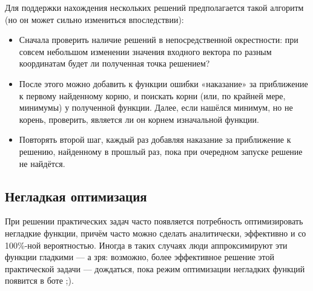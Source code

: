 \documentclass[11pt]{article}
\begin{document}
    Для поддержки нахождения нескольких решений предполагается такой алгоритм (но он может сильно измениться впоследствии):
    \begin{itemize}
        \item Сначала проверить наличие решений в непосредственной окрестности: при совсем небольшом изменении значения входного вектора
        по разным координатам будет ли полученная точка решением?
        \item После этого можно добавить к функции ошибки «наказание» за приближение к первому найденному корню, и поискать корни
        (или, по крайней мере, минимумы) у полученной функции. Далее, если нашёлся минимум, но не корень, проверить,
        является ли он корнем изначальной функции.
        \item Повторять второй шаг, каждый раз добавляя наказание за приближение к решению, найденному в прошлый раз,
        пока при очередном запуске решение не найдётся.
    \end{itemize}

    \subsection{Негладкая оптимизация}
    При решении практических задач часто появляется потребность оптимизировать негладкие функции,
    причём часто можно сделать аналитически, эффективно и со 100\%-ной вероятностью.
    Иногда в таких случаях люди аппроксимируют эти функции гладкими — а зря:
    возможно, более эффективное решение этой практической задачи — дождаться,
    пока режим оптимизации негладких функций появится в боте ;).
\end{document}
